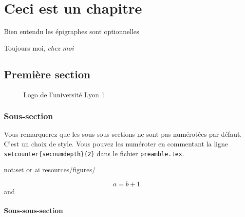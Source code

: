 \chapter{Ceci est un chapitre}

\epigraph{Bien entendu les épigraphes sont optionnelles}{Toujours moi, \textit{chez moi}}

\section{Première section}

\begin{figure}
    \centering
    \caption{Logo de l'université Lyon 1}
    \label{fig:logo}
\end{figure}


\subsection{Sous-section}
Vous remarquerez que les sous-sous-sections ne sont pas numérotées par défaut. C'est un choix de style. Vous pouvez les numéroter en commentant la ligne \texttt{\\setcounter\{secnumdepth\}\{2\}} dans le fichier \texttt{preamble.tex}.

\gls{not:set} or \gls{ai}
resources/figures/\currfiledir\currfilebase

\begin{equation}
    \label{eq:apb}
    a = b + 1
\end{equation}
 and 

\subsubsection{Sous-sous-section}
\lipsum[1-8]
